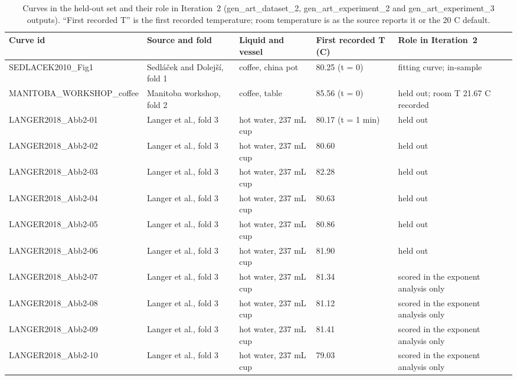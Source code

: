 \documentclass[11pt,letterpaper]{article}
\begin{document}
\begin{table}[!htbp]
\centering
\footnotesize
\caption{Curves in the held-out set and their role in Iteration~2 (gen\_art\_dataset\_2, gen\_art\_experiment\_2 and gen\_art\_experiment\_3 outputs). ``First recorded T'' is the first recorded temperature; room temperature is as the source reports it or the 20 C default.}
\label{tab:it2-curves}
\begin{tabularx}{\linewidth}{p{3.4cm}p{3.6cm}p{2.7cm}p{1.6cm}X}
\toprule
Curve id & Source and fold & Liquid and vessel & First recorded T (C) & Role in Iteration~2 \\
\midrule
SEDLACEK2010\_\allowbreak Fig1 & Sedl\'{a}\v{c}ek and Dolej\v{s}\'{i}, fold 1 & coffee, china pot & 80.25 (t = 0) & fitting curve; in-sample \\
MANITOBA\_\allowbreak WORKSHOP\_\allowbreak coffee & Manitoba workshop, fold 2 & coffee, table & 85.56 (t = 0) & held out; room T 21.67 C recorded \\
LANGER2018\_\allowbreak Abb2-01 & Langer et al., fold 3 & hot water, 237 mL cup & 80.17 (t = 1 min) & held out \\
LANGER2018\_\allowbreak Abb2-02 & Langer et al., fold 3 & hot water, 237 mL cup & 80.60 & held out \\
LANGER2018\_\allowbreak Abb2-03 & Langer et al., fold 3 & hot water, 237 mL cup & 82.28 & held out \\
LANGER2018\_\allowbreak Abb2-04 & Langer et al., fold 3 & hot water, 237 mL cup & 80.63 & held out \\
LANGER2018\_\allowbreak Abb2-05 & Langer et al., fold 3 & hot water, 237 mL cup & 80.86 & held out \\
LANGER2018\_\allowbreak Abb2-06 & Langer et al., fold 3 & hot water, 237 mL cup & 81.90 & held out \\
LANGER2018\_\allowbreak Abb2-07 & Langer et al., fold 3 & hot water, 237 mL cup & 81.34 & scored in the exponent analysis only \\
LANGER2018\_\allowbreak Abb2-08 & Langer et al., fold 3 & hot water, 237 mL cup & 81.12 & scored in the exponent analysis only \\
LANGER2018\_\allowbreak Abb2-09 & Langer et al., fold 3 & hot water, 237 mL cup & 81.41 & scored in the exponent analysis only \\
LANGER2018\_\allowbreak Abb2-10 & Langer et al., fold 3 & hot water, 237 mL cup & 79.03 & scored in the exponent analysis only \\
\bottomrule
\end{tabularx}
\end{table}
\end{document}
